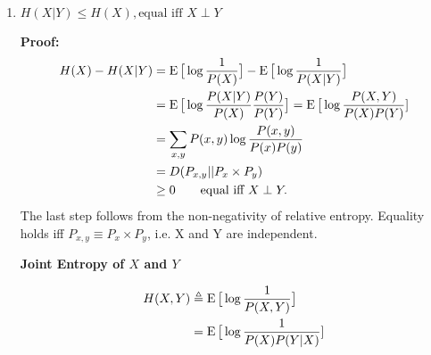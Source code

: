 \documentclass{article}
\begin{document}
\begin{enumerate}
Therefore, the entropy of independent random variables is the sum of the individual entropies. This is also intuitive, since the uncertainty (or surprise) associated with each random variable is independent. 

\begin{definition}
	\textbf{Conditional Entropy of $X$ given $Y$}
\begin{align} 
H(X|Y) &\triangleq \E\big[\log\frac{1}{P(X|Y)}\big] \\
&= \sum_{x,y}{\Pr{x,y}\frac{1}{\log P(x|y)}} \\
&= \sum_y{P(y) \big[\sum_xP(x|y)\frac{1}{\log P(x|y)}\big]}\\
&= \sum_y{P(y) H(X|y)}. 
\end{align}
\end{definition}
{\em Note:} The conditional entropy is a functional of the joint distribution of $(X, Y)$. Note that this is also a number, and denotes the ``average'' surprise in X when we observe Y. Here, by definition, we also average over the realizations of Y. Note that the conditional entropy is NOT a function of the random variable $Y$. In this sense, it is very different from a familar object in probability, the conditional expectation $E[X|Y]$ which is a random variable (and a function of $Y$).  

\item $ H(X|Y) \leq H(X), \text{equal iff } X \perp Y $

\textbf{Proof: }
	\begin{align}
	H(X) - H(X|Y) &= \operatorname{E}\big[\log\frac{1}{P(X)}\big] - \operatorname{E}\big[\log\frac{1}{P(X|Y)}\big] \\
	&= \operatorname{E}\big[\log\frac{P(X|Y)}{P(X)}\frac{P(Y)}{P(Y)}\big] = \operatorname{E}\big[\log\frac{P(X,Y)}{P(X)P(Y)}]\\
	&= \sum_{x,y}P(x,y)\log \frac{P(x, y)}{P(x)P(y)} \\
	&= D(P_{x,y}||P_x \times P_y) \\
	&\geq 0 \qquad \text{equal iff } X \perp Y.
\end{align} 
The last step follows from the non-negativity of relative entropy. Equality holds iff $P_{x,y} \equiv P_x \times P_y$, i.e. X and Y are independent. 
\begin{definition}\textbf{Joint Entropy of $X$ and $Y$}\end{definition}
\begin{align}
H(X,Y) &\triangleq \operatorname{E}\big[\log\frac{1}{P(X,Y)}\big] \\
&= \operatorname{E}\big[\log\frac{1}{P(X)P(Y|X)}]
\end{align}


\end{enumerate}
\end{document}
